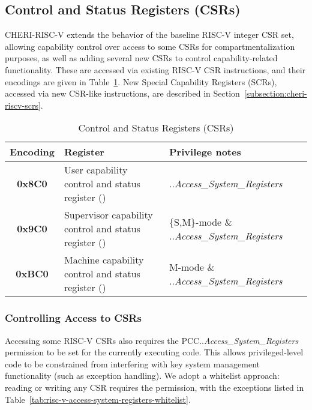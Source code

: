 \subsection{Control and Status Registers (CSRs)}
\label{subsection:cheri-riscv-csrs}

CHERI-RISC-V extends the behavior of the baseline RISC-V integer CSR set,
allowing capability control over access to some CSRs for compartmentalization
purposes, as well as adding several new CSRs to control capability-related
functionality.
These are accessed via existing RISC-V CSR instructions, and their encodings
are given in Table~\ref{tab:risc-v-control-and-status-registers}.
New Special Capability Registers (SCRs), accessed via new CSR-like
instructions, are described in Section~\ref{subsection:cheri-riscv-scrs}.

\begin{table}[h]
\centering
\begin{tabular}{c>{\raggedright\arraybackslash}p{2.7in}>{\raggedright\arraybackslash}p{2.5in}}
\toprule
\textbf{Encoding} & \textbf{Register} & Privilege notes \\
\midrule
\textbf{0x8C0} & User capability control and status register (\uccsr{}) & \PCC{}.\cperms{}.\emph{Access\_System\_Registers} \\
\textbf{0x9C0} & Supervisor capability control and status register (\sccsr{}) & \{S,M\}-mode \& \PCC{}.\cperms{}.\emph{Access\_System\_Registers} \\
\textbf{0xBC0} & Machine capability control and status register (\mccsr{}) & M-mode \& \PCC{}.\cperms{}.\emph{Access\_System\_Registers} \\
\bottomrule
\end{tabular}
\caption{Control and Status Registers (CSRs)}
\label{tab:risc-v-control-and-status-registers}
\end{table}

\subsubsection{Controlling Access to CSRs}

Accessing some RISC-V CSRs also requires the PCC{}.\cperms{}.\emph{Access\_System\_Registers}
permission to be set for the currently executing code.
This allows privileged-level code to be constrained from interfering with key
system management functionality (such as exception handling).
We adopt a whitelist approach: reading or writing any CSR requires the permission, with the exceptions listed in Table~\ref{tab:risc-v-access-system-registers-whitelist}.


